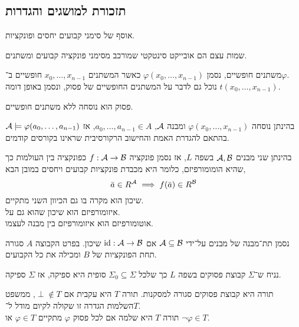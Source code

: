 \subsection{תזכורת למושגים והגדרות}
\begin{definition}[שפה]
	אוסף של סימני קבועים יחסים ופונקציות.
\end{definition}
\begin{definition}
	שמות עצם הם אובייקט סינטקטי שמורכב מסימני פונקציה קבועים ומשתנים.
\end{definition}
\begin{definition}
	משתנים חופשיים, נסמן $\varphi(x_0, \ldots, x_{n - 1})$ כאשר המשתנים $x_0, \ldots, x_{n - 1}$ חופשיים ב־$\varphi$. \\
	נוכל גם לדבר על המשתנים החופשיים של פסוק, ונסמן באופן דומה $t(x_0, \ldots, x_{n - 1})$.
\end{definition}
\begin{definition}[פסוק]
	פסוק הוא נוסחה ללא משתנים חופשיים.
\end{definition}
\begin{definition}[השמה]
	בהינתן נוסחה $\varphi(x_0, \ldots, x_{n - 1})$ ומבנה $\mathcal{A}$, $a_0, \ldots, a_{n - 1} \in A$,
	אז $\mathcal{A} \models \varphi(a_0, \ldots, a_{n - 1})$ בהתאם להגדרת האמת והחישוב הרקורסיבית שראינו בקורסים קודמים.
\end{definition}
\begin{definition}
	בהינתן שני מבנים $\mathcal{A}, \mathcal{B}$ בשפה $L$, אז נסמן פונקציה $f : \mathcal{A} \to \mathcal{B}$ כפונקציה בין העולמות כך שהיא הומומורפיזם,
	כלומר היא מכבדת פונקציות קבועים ויחסים במובן הבא,
	\[
		\bar{a} \in R^{\mathcal{A}}
		\implies f(\bar{a}) \in R^{\mathcal{B}}
	\]
	שיכון הוא מקרה בו גם הכיוון השני מתקיים. \\
	איזומורפיזם הוא שיכון שהוא גם על. \\
	אוטומורפיזם הוא איזומורפיזם בין מבנה לעצמו.
\end{definition}
\begin{definition}[תת־מבנה]
	נסמן תת־מבנה של מבנים על־ידי $\mathcal{A} \subseteq \mathcal{B}$ אם $\operatorname{id} : \mathcal{A} \to \mathcal{B}$ שיכון.
	בפרט הקבוצה $A$ סגורה תחת הפונקציות של $B$ ומכילה את כל הקבועים.
\end{definition}
\begin{theorem}
	נניח ש־$\Sigma$ קבוצת פסוקים בשפה $L$ כך שלכל $\Sigma_0 \subseteq \Sigma$ סופית היא ספיקה, אז $\Sigma$ ספיקה.
\end{theorem}
\begin{definition}[תורה]
	תורה היא קבוצת פסוקים סגורה למסקנות.
	תורה $T$ היא עקבית אם $\perp \notin T$, ממשפט השלמות הגדרה זו שקולה לקיום מודל ל־$T$. \\
	תורה $T$ היא שלמה אם לכל פסוק $\varphi$ מתקיים $\varphi \in T$ או $\lnot \varphi \in T$.
\end{definition}
